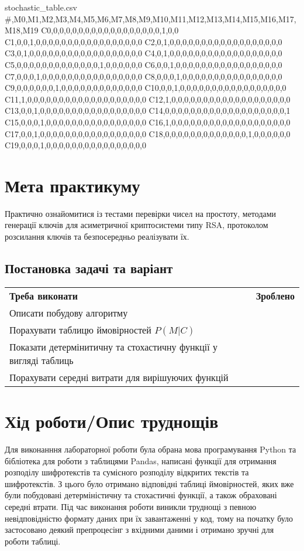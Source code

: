 \begin{filecontents*}{stochastic_table.csv}
#,M0,M1,M2,M3,M4,M5,M6,M7,M8,M9,M10,M11,M12,M13,M14,M15,M16,M17,M18,M19
C0,0,0,0,0,0,0,0,0,0,0,0,0,0,0,0,0,0,1,0,0
C1,0,0,1,0,0,0,0,0,0,0,0,0,0,0,0,0,0,0,0,0
C2,0,1,0,0,0,0,0,0,0,0,0,0,0,0,0,0,0,0,0,0
C3,0,1,0,0,0,0,0,0,0,0,0,0,0,0,0,0,0,0,0,0
C4,0,1,0,0,0,0,0,0,0,0,0,0,0,0,0,0,0,0,0,0
C5,0,0,0,0,0,0,0,0,0,0,0,0,0,1,0,0,0,0,0,0
C6,0,0,1,0,0,0,0,0,0,0,0,0,0,0,0,0,0,0,0,0
C7,0,0,0,1,0,0,0,0,0,0,0,0,0,0,0,0,0,0,0,0
C8,0,0,0,1,0,0,0,0,0,0,0,0,0,0,0,0,0,0,0,0
C9,0,0,0,0,0,0,1,0,0,0,0,0,0,0,0,0,0,0,0,0
C10,0,0,1,0,0,0,0,0,0,0,0,0,0,0,0,0,0,0,0,0
C11,1,0,0,0,0,0,0,0,0,0,0,0,0,0,0,0,0,0,0,0
C12,1,0,0,0,0,0,0,0,0,0,0,0,0,0,0,0,0,0,0,0
C13,0,0,1,0,0,0,0,0,0,0,0,0,0,0,0,0,0,0,0,0
C14,0,0,0,0,0,0,0,0,0,0,0,0,0,0,0,0,0,0,0,1
C15,0,0,0,1,0,0,0,0,0,0,0,0,0,0,0,0,0,0,0,0
C16,1,0,0,0,0,0,0,0,0,0,0,0,0,0,0,0,0,0,0,0
C17,0,0,1,0,0,0,0,0,0,0,0,0,0,0,0,0,0,0,0,0
C18,0,0,0,0,0,0,0,0,0,0,0,0,0,1,0,0,0,0,0,0
C19,0,0,0,1,0,0,0,0,0,0,0,0,0,0,0,0,0,0,0,0
\end{filecontents*}

\section{Мета практикуму}
Практично ознайомитися із тестами перевірки чисел на простоту, методами генерації ключів для асиметричної криптосистеми типу RSA, протоколом розсилання ключів та безпосередньо реалізувати їх.

\subsection{Постановка задачі та варіант}
\begin{tabularx}{\textwidth}{X|X}
	\textbf{Треба виконати} & \textbf{Зроблено} \\
	Описати побудову алгоритму \checkmark\\
	Порахувати таблицю ймовірностей $P(\textit{M}|\textit{C})$ \checkmark\\
	Показати детермінитичну та стохастичну функції у вигляді таблиць & \checkmark\\
	Порахувати середні витрати для вирішуючих функцій & \checkmark\\
\end{tabularx}



\section{Хід роботи/Опис труднощів}
Для виконанння лабораторної роботи була обрана мова програмування Python та бібліотека для роботи з таблицями Pandas, написані функції для отримання розподілу шифротекстів та сумісного розподілу відкритих текстів та шифротекстів. З цього було отримано відповідні таблиці ймовірностей, яких вже були побудовані детерміністичну та стохастичні функції, а також обраховані середні втрати. Під час виконання роботи виникли труднощі з певною невідповідністю формату даних при їх завантаженні у код, тому на початку було застосовано деякий препроцесінг з вхідними даними і отримано зручні для роботи таблиці.


